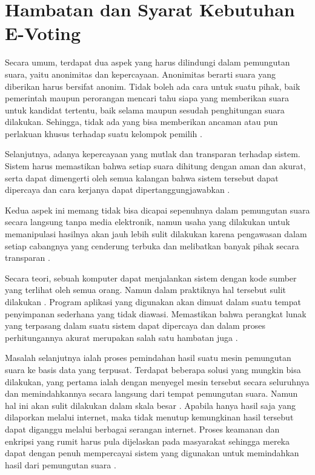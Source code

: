 \section{Hambatan dan Syarat Kebutuhan E-Voting}

Secara umum, terdapat dua aspek yang harus dilindungi dalam pemungutan suara, yaitu anonimitas dan kepercayaan. Anonimitas berarti suara yang diberikan harus bersifat anonim. Tidak boleh ada cara untuk suatu pihak, baik pemerintah maupun perorangan mencari tahu siapa yang memberikan suara untuk kandidat tertentu, baik selama maupun sesudah penghitungan suara dilakukan. Sehingga, tidak ada yang bisa memberikan ancaman atau pun perlakuan khusus terhadap suatu kelompok pemilih \citep{sysreview}.

Selanjutnya, adanya kepercayaan yang mutlak dan transparan terhadap sistem. Sistem harus memastikan bahwa setiap suara dihitung dengan aman dan akurat, serta dapat dimengerti oleh semua kalangan bahwa sistem tersebut dapat dipercaya dan cara kerjanya dapat dipertanggungjawabkan \citep{wang2017review}.

Kedua aspek ini memang tidak bisa dicapai sepenuhnya dalam pemungutan suara secara langsung tanpa media elektronik, namun usaha yang dilakukan untuk memanipulasi hasilnya akan jauh lebih sulit dilakukan karena pengawasan dalam setiap cabangnya yang cenderung terbuka dan melibatkan banyak pihak secara transparan \citep{wang2017review}.

Secara teori, sebuah komputer dapat menjalankan sistem dengan kode sumber yang terlihat oleh semua orang. Namun dalam praktiknya hal tersebut sulit dilakukan \cite{10.1007/3-540-57220-1_66}. Program aplikasi yang digunakan akan dimuat dalam suatu tempat penyimpanan sederhana yang tidak diawasi. Memastikan bahwa perangkat lunak yang terpasang dalam suatu sistem dapat dipercaya dan dalam proses perhitungannya akurat merupakan salah satu hambatan juga \citep{7571928}.

Masalah selanjutnya ialah proses pemindahan hasil suatu mesin pemungutan suara ke basis data yang terpusat. Terdapat beberapa solusi yang mungkin bisa dilakukan, yang pertama ialah dengan menyegel mesin tersebut secara seluruhnya dan memindahkannya secara langsung dari tempat pemungutan suara. Namun hal ini akan sulit dilakukan dalam skala besar \citep{sysreview}. Apabila hanya hasil saja yang dilaporkan melalui internet, maka tidak menutup kemungkinan hasil tersebut dapat diganggu melalui berbagai serangan internet. Proses keamanan dan enkripsi yang rumit harus pula dijelaskan pada masyarakat sehingga mereka dapat dengan penuh mempercayai sistem yang digunakan untuk memindahkan hasil dari pemungutan suara \citep{reviewevote}.

